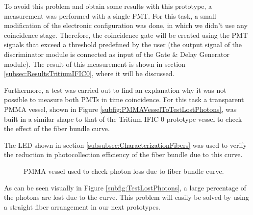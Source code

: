 To avoid this problem and obtain some results with this prototype, a measurement was performed with a single PMT. For this task, a small modification of the electronic configuration was done, in which we didn't use any coincidence stage. Therefore, the coincidence gate will be created using the PMT signals that exceed a threshold predefined by the user (the output signal of the discriminator module is connected as input of the Gate \& Delay Generator module). The result of this measurement is shown in section \ref{subsec:ResultsTritiumIFIC0}, where it will be discussed.

Furthermore, a test was carried out to find an explanation why it was not possible to measure both PMTs in time coincidence. For this task a transparent PMMA vessel, shown in Figure \ref{subfig:PMMAVesselToTestLostPhotons}, was built in a similar shape to that of the Tritium-IFIC 0 prototype vessel to check the effect of the fiber bundle curve. 

The LED shown in section \ref{subsubsec:CharacterizationFibers} was used to verify the reduction in photocollection efficiency of the fiber bundle due to this curve. 

\begin{figure}[h]
 \centering
 \caption{PMMA vessel used to check photon loss due to fiber bundle curve.}
 \label{fig:TestLostPhotons}
\end{figure}

As can be seen visually in Figure \ref{subfig:TestLostPhotons}, a large percentage of the photons are lost due to the curve. This problem will easily be solved by using a straight fiber arrangement in our next prototypes.


